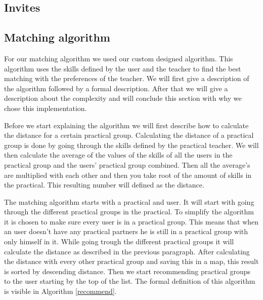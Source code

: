 \subsection{Invites}

\subsection{Matching algorithm}
For our matching algorithm we used our custom designed algorithm.
This algorithm uses the skills defined by the user and the teacher to find the best matching with the preferences of the teacher.
We will first give a description of the algorithm followed by a formal description.
After that we will give a description about the complexity and will conclude this section with why we chose this implementation.

Before we start explaining the algorithm we will first describe how to calculate the distance for a certain practical group.
Calculating the distance of a practical group is done by going through the skills defined by the practical teacher.
We will then calculate the average of the values of the skills of all the users in the practical group and the users' practical group combined.
Then all the average's are multiplied with each other and then you take root of the amount of skills in the practical.
This resulting number will defined as the distance.

The matching algorithm starts with a practical and user.
It will start with going through the different practical groups in the practical.
To simplify the algorithm it is chosen to make sure every user is in a practical group.
This means that when an user doesn't have any practical partners he is still in a practical group with only himself in it.
While going trough the different practical groups it will calculate the distance as described in the previous paragraph.
After calculating the distance with every other practical group and saving this in a map, this result is sorted by descending distance.
Then we start recommending practical groups to the user starting by the top of the list.
The formal definition of this algorithm is visible in Algorithm \ref{recommend}.

